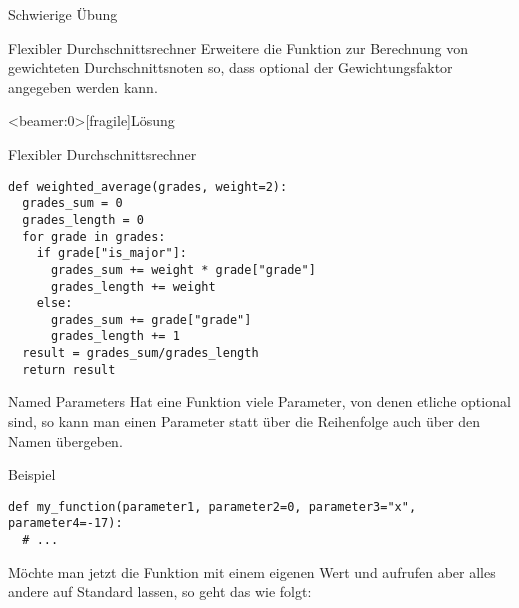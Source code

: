 \begin{frame}{Schwierige Übung}

\begin{block}{Flexibler Durchschnittsrechner}
\vspace{2pt}
Erweitere die Funktion zur Berechnung von gewichteten Durchschnittsnoten so, dass optional der Gewichtungsfaktor angegeben werden kann. 	
\end{block}

\end{frame}

\begin{frame}<beamer:0>[fragile]{Lösung}

\begin{solutionblock}{Flexibler Durchschnittsrechner}
\begin{verbatim}
def weighted_average(grades, weight=2): 
  grades_sum = 0
  grades_length = 0
  for grade in grades: 
    if grade["is_major"]: 
      grades_sum += weight * grade["grade"]
      grades_length += weight
    else:
      grades_sum += grade["grade"]
      grades_length += 1
  result = grades_sum/grades_length
  return result 
\end{verbatim}
\end{solutionblock}

\end{frame}

\begin{fragile}
	
\begin{block}{Named Parameters}
\vspace{2pt}
Hat eine Funktion viele Parameter, von denen etliche optional sind, so kann man einen Parameter statt über die Reihenfolge auch über den Namen übergeben. 
\end{block}

\pause 
\vspace{12pt}

\begin{exampleblock}{Beispiel}
\vspace{2pt}

\begin{verbatim}
def my_function(parameter1, parameter2=0, parameter3="x", parameter4=-17):
  # ... 
\end{verbatim}
Möchte man jetzt die Funktion mit einem eigenen Wert  und  aufrufen aber alles andere auf Standard lassen, so geht das wie folgt: 

\end{exampleblock}

	
\end{fragile}



